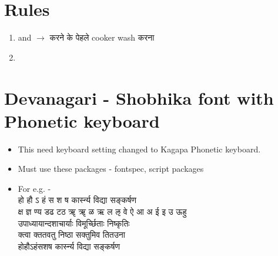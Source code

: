 \documentclass{article}
\begin{document}
\section{\s  Rules} 

\begin{enumerate}
    \item {\s {} and  $\longrightarrow$  करने के पेहले cooker wash करना } 
    \item 
\end{enumerate}



\section{Devanagari - Shobhika font with Phonetic keyboard}
\begin{Large}
    \begin{itemize}
    \item This need keyboard setting changed to Kagapa Phonetic keyboard.
    
    \item Must use these packages - fontspec, script packages
    \item For e.g. -\\
{\scriptsize {\s हो हौ ऽ हं स श ष कार्स्न्य विद्या सङ्कर्षण}}\\
{\small {\s क्ष ज्ञ ण्य डढ टठ ॠ ॠ ळ ऋ ल ऌ वे ऐ आ अ ई इ उ ऊहु }}\\
{\large {\s उपाध्यायान्दशाचार्याः विमूर्च्छिताः निष्कृतिः}}\\
{\Large {\s क्त्वा क्ततवतु निष्ठा सक्तुमिव तितउना }}\\
{\huge {\s होहौऽहंसशष कार्स्न्य विद्या सङ्कर्षण}} 
\end{itemize}
\end{Large}
\pagebreak
\end{document}
